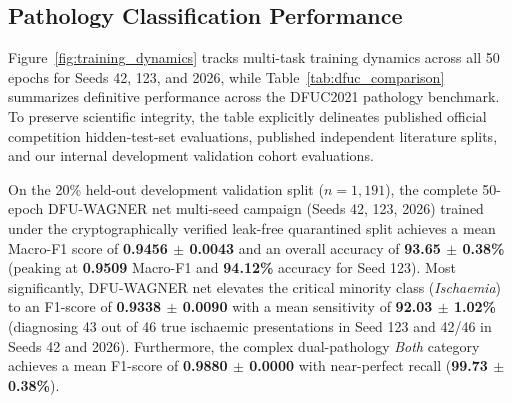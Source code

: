 \documentclass[journal]{IEEEtran}
\begin{document}
\subsection{Pathology Classification Performance}
Figure~\ref{fig:training_dynamics} tracks multi-task training dynamics across all 50 epochs for Seeds 42, 123, and 2026, while Table~\ref{tab:dfuc_comparison} summarizes definitive performance across the DFUC2021 pathology benchmark. To preserve scientific integrity, the table explicitly delineates published official competition hidden-test-set evaluations, published independent literature splits, and our internal development validation cohort evaluations.

On the 20\% held-out development validation split ($n = 1,191$), the complete 50-epoch DFU-WAGNER net multi-seed campaign (Seeds 42, 123, 2026) trained under the cryptographically verified leak-free quarantined split achieves a mean Macro-F1 score of \textbf{0.9456 $\pm$ 0.0043} and an overall accuracy of \textbf{93.65 $\pm$ 0.38\%} (peaking at \textbf{0.9509} Macro-F1 and \textbf{94.12\%} accuracy for Seed 123). Most significantly, DFU-WAGNER net elevates the critical minority class (\textit{Ischaemia}) to an F1-score of \textbf{0.9338 $\pm$ 0.0090} with a mean sensitivity of \textbf{92.03 $\pm$ 1.02\%} (diagnosing 43 out of 46 true ischaemic presentations in Seed 123 and 42/46 in Seeds 42 and 2026). Furthermore, the complex dual-pathology \textit{Both} category achieves a mean F1-score of \textbf{0.9880 $\pm$ 0.0000} with near-perfect recall (\textbf{99.73 $\pm$ 0.38\%}).
\end{document}

